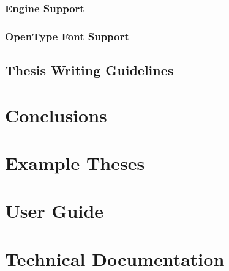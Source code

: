       \subsection{ Engine Support} 
      \blindtext

      \subsection{OpenType Font Support} 
      \blindtext

    \section{Thesis Writing Guidelines} 
    \blindtext

  \chapter{Conclusions} 
    \blindtext

  \newpage
  {\footnotesize
  \singlespacing
  \nocite{*}
  }

  \newpage
  \printglossaries

  \printindex

  \begin{appendices}

    \chapter{Example Theses} 
      \blindtext

    \chapter{User Guide} 
      \blindtext

    \chapter{Technical Documentation} 
      \blindtext

  \end{appendices}


